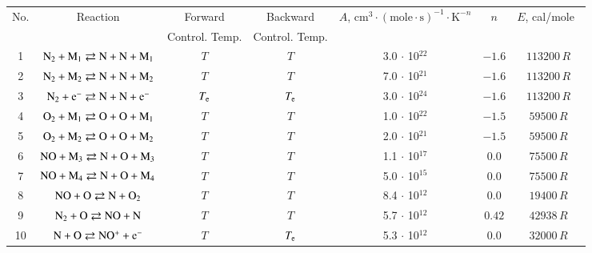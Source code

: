 \documentclass{warpdoc}
\renewcommand{\fontsizetable}{\footnotesize\scalefont{0.9}}
\begin{document}
%
\begin{table}[t]
\fontsizetable
\begin{center}
\begin{threeparttable}
\begin{tabular}{ccccccc} 
\toprule
No. & Reaction\tnote{(b)} & Forward          & Backward    & $A$, $\textrm{cm}^3\cdot(\textrm{mole}\cdot \textrm{s})^{-1}\cdot \textrm{K}^{-n}$ & $n$ & $E$, cal/mole~\tnote{(a)}\\ 
~   & ~                   & Control. Temp.   & Control. Temp.\tnote{(c)} &~ & ~ & ~ \\
\midrule
1 & $\rm N_2 + M_1 \rightleftarrows N + N + M_1$ & $T$ & $T$  & 3.0 $\cdot$ 10$^{22}$  & $-1.6$ & $113200 \, R$  \\

2 & $\rm N_2 + M_2 \rightleftarrows N + N + M_2$ & $T$ & $T$ & 7.0 $\cdot$ 10$^{21}$  & $-1.6$ & $113200 \, R$ \\

3 & $\rm N_2 + e^- \rightleftarrows N + N + e^-$ & $T_{\rm e}$ & $T_{\rm e}$ & 3.0 $\cdot$ 10$^{24}$  & $-1.6$ & $113200 \, R$  \\

4 & $\rm O_2 + M_1 \rightleftarrows O + O + M_1$ & $T$ & $T$ & 1.0 $\cdot$ 10$^{22}$  & $-1.5$ & $59500 \, R$ \\

5 & $\rm O_2 + M_2 \rightleftarrows O + O + M_2$ & $T$ & $T$ & 2.0 $\cdot$ 10$^{21}$  & $-1.5$ & $59500 \, R$ \\

6 & $\rm NO + M_3 \rightleftarrows N + O + M_3$ & $T$ & $T$ & 1.1 $\cdot$ 10$^{17}$  & 0.0 & $75500 \, R$ \\

7 & $\rm NO + M_4 \rightleftarrows N + O + M_4$ & $T$ & $T$ & 5.0 $\cdot$ 10$^{15}$  & 0.0 & $75500 \, R$ \\

8 & $\rm NO + O \rightleftarrows N + O_2 $ & $T$  & $T$ & 8.4 $\cdot$ 10$^{12}$  & 0.0 & $19400 \, R$ \\

9 & $\rm N_2 + O \rightleftarrows NO + N $ & $T$  & $T$ & 5.7 $\cdot$ 10$^{12}$  & $0.42$ & $42938 \, R$ \\

10 & $\rm N + O \rightleftarrows NO^+ + e^- $ & $T$ & $T_{\rm e}$ & 5.3 $\cdot$ 10$^{12}$  & 0.0 & $32000 \, R$  \\


\end{tabular}
\end{threeparttable}
\end{center}
\end{table}
\end{document}
